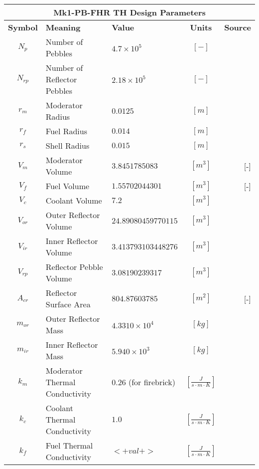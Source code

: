 
\begin{table}[ht!]
\centering
\begin{tabularx}{\textwidth}{|c|l|X|c|r|}
\multicolumn{5}{c}{\textbf{Mk1-PB-FHR TH Design Parameters}}\\
\hline
\textbf{Symbol} & \textbf{Meaning} & \textbf{Value} & \textbf{Units} & \textbf{Source} \\
\hline
$N_p$ & Number of Pebbles & $4.7\times10^5 $ & $[-]$ & \cite{andreades_technical_2014} \\
$N_{rp}$ & Number of Reflector Pebbles & $2.18\times10^5 $ & $[-]$ & \cite{andreades_technical_2014} \\
$r_m$ & Moderator Radius & $0.0125$ & $[m]$ & \cite{andreades_technical_2014} \\
$r_f$ & Fuel Radius & $0.014$ & $[m]$ & \cite{andreades_technical_2014} \\
$r_s$ & Shell Radius & $0.015$ & $[m]$ & \cite{andreades_technical_2014} \\
$V_m$ & Moderator Volume & $3.8451785083$ & $[m^3]$ & [-] \\
$V_f$ & Fuel Volume & $1.55702044301$ & $[m^3]$ & [-] \\
$V_c$ & Coolant Volume & $7.2$ & $[m^3]$ & \cite{andreades_technical_2014} \\
$V_{or}$ & Outer Reflector Volume & $24.89080459770115$ & $[m^3]$ & \cite{andreades_technical_2014} \\
$V_{ir}$ & Inner Reflector Volume & $3.413793103448276$ & $[m^3]$ & \cite{andreades_technical_2014} \\
$V_{rp}$ & Reflector Pebble Volume & $3.08190239317$ & $[m^3]$ & \cite{andreades_technical_2014} \\
$A_{cr}$ & Reflector Surface Area& $804.87603785$ & $[m^2]$ & [-]\\
$m_{or}$ & Outer Reflector Mass & $4.3310\times 10^4$ & $[kg]$ & \cite{andreades_technical_2014} \\
$m_{ir}$ & Inner Reflector Mass & $5.940\times 10^3$ & $[kg]$ & \cite{andreades_technical_2014} \\
$k_m$ & Moderator Thermal Conductivity & $0.26$ (for firebrick) & $[\frac{J}{s\cdot m\cdot K}]$ & \cite{andreades_technical_2014} \\
$k_c$ & Coolant Thermal Conductivity & $1.0$ & $[\frac{J}{s\cdot m\cdot K}]$ & \cite{gierszewski_property_1980,andreades_technical_2014} \\
$k_f$ & Fuel Thermal Conductivity & $<+val+>$ & $[\frac{J}{s\cdot m\cdot K}]$ & \cite{<+ref+>} \\

\end{tabularx}
\end{table}

